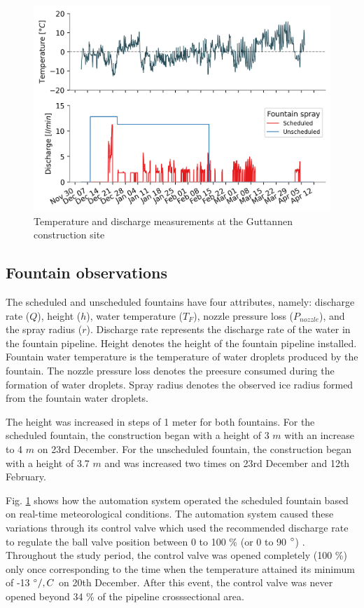 \documentclass[tc, manuscript]{copernicus}
\begin{document}
\begin{figure}[t]
\includegraphics[width=12cm]{Figures/disvstemp.png}
\caption{Temperature and discharge measurements at the Guttannen construction site}
\label{fig:aws} 
\end{figure}

\subsection{Fountain observations}

The scheduled and unscheduled fountains have four attributes, namely: discharge rate ($Q$), height ($h$), water
temperature ($T_F$), nozzle pressure loss ($P_{nozzle}$), and the spray radius ($r$). Discharge rate represents
the discharge rate of the water in the fountain pipeline. Height denotes the height of the fountain pipeline
installed. Fountain water temperature is the temperature of water droplets produced by the fountain. The nozzle
pressure loss denotes the preesure consumed during the formation of water droplets. Spray radius denotes the
observed ice radius formed from the fountain water droplets.

The height was increased in steps of 1 meter for both fountains. For the scheduled fountain, the
construction began with a height of 3 $m$ with an increase to 4 $m$ on 23rd December. For the unscheduled
fountain, the construction began with a height of 3.7 $m$ and was increased two times on 23rd December
and 12th February.

Fig. \ref{fig:aws} shows how the automation system operated the scheduled fountain based on real-time
meteorological conditions. The automation system caused these variations through its control valve which used
the recommended discharge rate to regulate the ball valve position between 0 to 100 \% (or 0 to 90 $^{\circ}$) .
Throughout the study period, the control valve was opened completely (100 \%) only once corresponding to the
time when the temperature attained its minimum of -13 $^{\circ}/,C$ on 20th December. After this event, the
control valve was never opened beyond 34 \% of the pipeline crosssectional area.  
\end{document}
